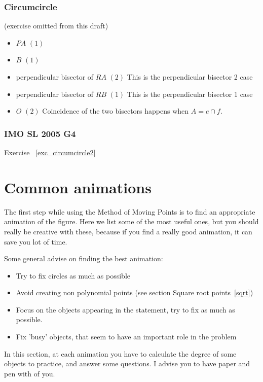 \documentclass[a4paper]{article}
\begin{document}
\subsubsection{Circumcircle}
\label{sol_circumcircle1}
(exercise omitted from this draft)
\begin{itemize}
    \item $PA$ $(1)$
    \item $B$ $(1)$
    \item perpendicular bisector of $RA$ $(2)$ This is the perpendicular bisector 2 case
    \item perpendicular bisector of $RB$ $(1)$ This is the perpendicular bisector 1 case
    \item $O$ $(2)$ Coincidence of the two bisectors happens when $A=e\cap f$.
\end{itemize}

\subsubsection{IMO SL 2005 G4}
\label{sol_circumcircle2}
Exercise ~\ref{exc_circumcircle2}

\section{Common animations}

The first step while using the Method of Moving Points is to find an appropriate animation of the figure. Here we list some of the most useful ones, but you should really be creative with these, because if you find a really good animation, it can save you lot of time.

Some general advise on finding the best animation: 
\begin{itemize}
    \item Try to fix circles as much as possible
    \item Avoid creating non polynomial points (see section Square root points~\ref{sqrt})
    \item Focus on the objects appearing in the statement, try to fix as much as possible.
    \item Fix 'busy' objects, that seem to have an important role in the problem
\end{itemize}

In this section, at each animation you have to calculate the degree of some objects to practice, and answer some questions. I advise you to have paper and pen with of you.
\end{document}
